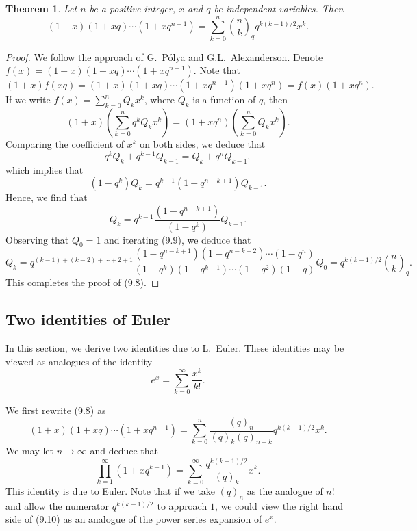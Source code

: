 \documentclass{article}
\newtheorem{theorem}{Theorem}[section]
\begin{document}
\begin{theorem}
Let $n$ be a positive integer, $x$ and $q$ be independent variables. Then
\begin{equation}
(1+x)(1+xq)\cdots(1+xq^{n-1}) = \sum_{k=0}^{n} \binom{n}{k}_q q^{k(k-1)/2} x^k.
\tag{9.8}
\end{equation}
\end{theorem}

\begin{proof}
We follow the approach of G.\ P\'olya and G.L.\ Alexanderson. Denote
$f(x) = (1+x)(1+xq)\cdots(1+xq^{n-1})$.
Note that
\[
(1+x)f(xq) = (1+x)(1+xq)\cdots(1+xq^{n-1})(1+xq^n) = f(x)(1+xq^n).
\]
If we write $f(x) = \sum_{k=0}^{n} Q_k x^k$,
where $Q_k$ is a function of $q$, then
\[
(1+x)\left(\sum_{k=0}^{n} q^k Q_k x^k\right) = (1+xq^n)\left(\sum_{k=0}^{n} Q_k x^k\right).
\]
Comparing the coefficient of $x^k$ on both sides, we deduce that
\[
q^k Q_k + q^{k-1} Q_{k-1} = Q_k + q^n Q_{k-1},
\]
which implies that
\[
(1-q^k) Q_k = q^{k-1}(1-q^{n-k+1}) Q_{k-1}.
\]
Hence, we find that
\begin{equation}
Q_k = q^{k-1} \frac{(1-q^{n-k+1})}{(1-q^k)} Q_{k-1}.
\tag{9.9}
\end{equation}
Observing that $Q_0 = 1$ and iterating (9.9), we deduce that
\[
Q_k = q^{(k-1)+(k-2)+\cdots+2+1} \frac{(1-q^{n-k+1})(1-q^{n-k+2})\cdots(1-q^n)}{(1-q^k)(1-q^{k-1})\cdots(1-q^2)(1-q)} Q_0 = q^{k(k-1)/2} \binom{n}{k}_q.
\]
This completes the proof of (9.8).
\end{proof}

\subsection{Two identities of Euler}

In this section, we derive two identities due to L.\ Euler. These identities may be
viewed as analogues of the identity
\[
e^x = \sum_{k=0}^{\infty} \frac{x^k}{k!}.
\]

We first rewrite (9.8) as
\[
(1+x)(1+xq)\cdots(1+xq^{n-1}) = \sum_{k=0}^{n} \frac{(q)_n}{(q)_k (q)_{n-k}} q^{k(k-1)/2} x^k.
\]
We may let $n \to \infty$ and deduce that
\begin{equation}
\prod_{k=1}^{\infty} (1 + xq^{k-1}) = \sum_{k=0}^{\infty} \frac{q^{k(k-1)/2}}{(q)_k} x^k.
\tag{9.10}
\end{equation}
This identity is due to Euler. Note that if we take $(q)_n$ as the analogue of $n!$ and
allow the numerator $q^{k(k-1)/2}$ to approach $1$, we could view the right hand side
of (9.10) as an analogue of the power series expansion of $e^x$.
\end{document}
